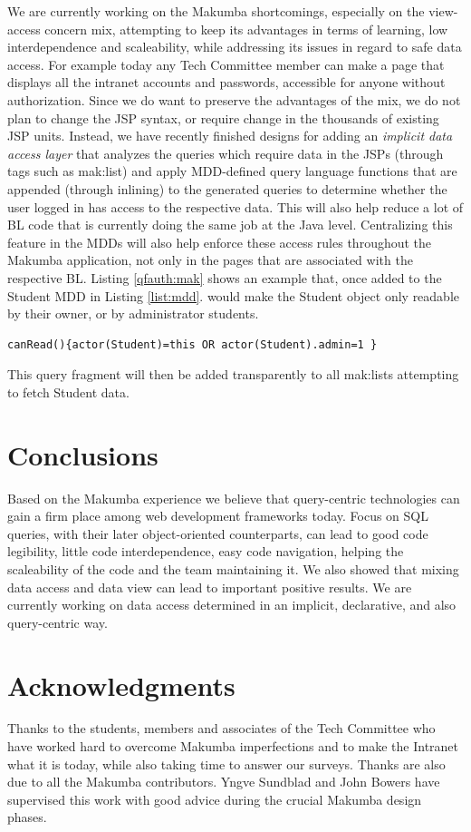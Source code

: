 \documentclass{llncs}
\begin{document}
We are currently working on the Makumba shortcomings, especially on the view-access concern mix, attempting to keep its advantages in terms of learning, low interdependence and scaleability, while addressing its issues in regard to safe data access. For example today any Tech Committee member can make a page that displays all the intranet accounts and passwords, accessible for anyone without authorization. Since we do want to preserve the advantages of the mix, we do not plan to change the JSP syntax, or require change in the thousands of existing JSP units. Instead, we have recently finished designs for adding an \textit{implicit data access layer} that analyzes the queries which require data in the JSPs (through tags such as mak:list) and apply MDD-defined query language functions that are appended (through inlining)  to the generated queries to determine whether the user logged in has access to the respective data. This will also help reduce a lot of  BL code that is currently doing the same job at the Java level. Centralizing this feature in the MDDs will also help enforce these access rules throughout the Makumba application, not only in the pages that are associated with the respective BL. Listing \ref{qfauth:mak} shows an example that, once added to the Student MDD in Listing \ref{list:mdd}. would make the Student object only readable by their owner, or by administrator students.
\lstset{basicstyle=\small, captionpos=b, caption= query fragment authorization rule, label=qfauth:mak, frame=shadowbox}
\begin{lstlisting}
canRead(){actor(Student)=this OR actor(Student).admin=1 }
\end{lstlisting}
This query fragment will then be added transparently to all mak:lists attempting to fetch Student data.


\section{Conclusions}\label{sec:conclusions}
Based on the Makumba experience we believe that query-centric technologies can gain a firm place among web development frameworks today. Focus on SQL queries, with their later object-oriented counterparts, can lead to good  code legibility, little code interdependence, easy code navigation,  helping the scaleability of the code and the team maintaining it.  We also showed that mixing data access and data view can lead to important positive results. We are currently working on data access determined in an implicit, declarative, and also query-centric way. 

\section{Acknowledgments}\label{sec:acknowledgments}
Thanks to the students, members and associates of the Tech Committee who have worked hard to overcome Makumba imperfections and to make the Intranet what it is today, while also taking time to answer our surveys.  Thanks are also due to all the Makumba contributors.  Yngve Sundblad and John Bowers have supervised this work with good advice during the crucial Makumba design phases.



 
\end{document}
